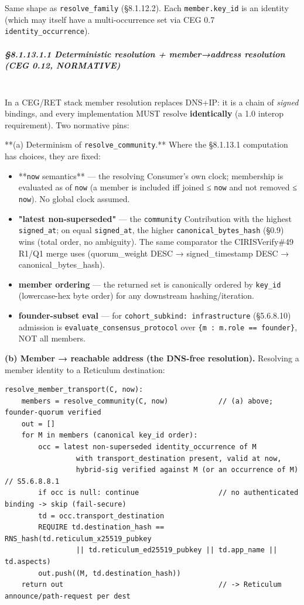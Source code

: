 \documentclass[11pt]{article}
\begin{document}
Same shape as \texttt{resolve\_family} (§8.1.12.2). Each \texttt{member.key\_id} is an identity (which may itself have a multi-occurrence set via CEG 0.7 \texttt{identity\_occurrence}).


\subparagraph{§8.1.13.1.1 Deterministic resolution + member→address resolution (CEG 0.12, NORMATIVE)}\mbox{}\\


In a CEG/RET stack member resolution replaces DNS+IP: it is a chain of \textit{signed} bindings, and every implementation MUST resolve \textbf{identically} (a 1.0 interop requirement). Two normative pins:


**(a) Determinism of \texttt{resolve\_community}.** Where the §8.1.13.1 computation has choices, they are fixed:

\begin{itemize}\setlength\itemsep{0pt}
\item **\texttt{now} semantics** — the resolving Consumer's own clock; membership is evaluated as of \texttt{now} (a member is included iff joined ≤ \texttt{now} and not removed ≤ \texttt{now}). No global clock assumed.
\item \textbf{"latest non-superseded"} — the \texttt{community} Contribution with the highest \texttt{signed\_at}; on equal \texttt{signed\_at}, the higher \texttt{canonical\_bytes\_hash} (§0.9) wins (total order, no ambiguity). The same comparator the CIRISVerify\#49 R1/Q1 merge uses (quorum\_weight DESC → signed\_timestamp DESC → canonical\_bytes\_hash).
\item \textbf{member ordering} — the returned set is canonically ordered by \texttt{key\_id} (lowercase-hex byte order) for any downstream hashing/iteration.
\item \textbf{founder-subset eval} — for \texttt{cohort\_subkind: infrastructure} (§5.6.8.10) admission is \texttt{evaluate\_consensus\_protocol} over \texttt{\{m : m.role == founder\}}, NOT all members.
\end{itemize}


\textbf{(b) Member → reachable address (the DNS-free resolution).} Resolving a member identity to a Reticulum destination:


\begin{lstlisting}
resolve_member_transport(C, now):
    members = resolve_community(C, now)            // (a) above; founder-quorum verified
    out = []
    for M in members (canonical key_id order):
        occ = latest non-superseded identity_occurrence of M
                 with transport_destination present, valid at now,
                 hybrid-sig verified against M (or an occurrence of M)   // S5.6.8.8.1
        if occ is null: continue                   // no authenticated binding -> skip (fail-secure)
        td = occ.transport_destination
        REQUIRE td.destination_hash == RNS_hash(td.reticulum_x25519_pubkey
                 || td.reticulum_ed25519_pubkey || td.app_name || td.aspects)
        out.push((M, td.destination_hash))
    return out                                     // -> Reticulum announce/path-request per dest
\end{lstlisting}
\end{document}
